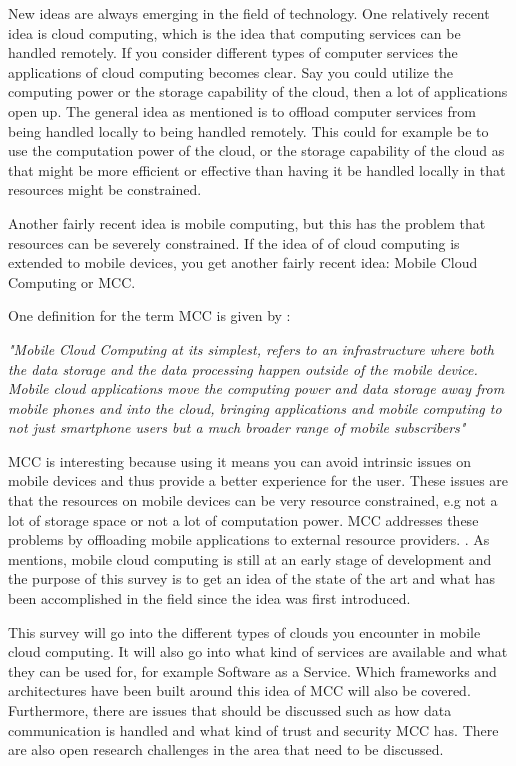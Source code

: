 
New ideas are always emerging in the field of technology.
One relatively recent idea is cloud computing, which is the idea that computing services can be handled remotely.
If you consider different types of computer services the applications of cloud computing becomes clear.
Say you could utilize the computing power or the storage capability of the cloud, then a lot of applications open up.
The general idea as mentioned is to offload computer services from being handled locally to being handled remotely. 
This could for example be to use the computation power of the cloud, or the storage capability of the cloud as that might be more efficient or effective than having it be handled locally in that resources might be constrained.

Another fairly recent idea is mobile computing, but this has the problem that resources can be severely constrained. 
If the idea of of cloud computing is extended to mobile devices, you get another fairly recent idea: Mobile Cloud Computing or MCC.

One definition for the term MCC is given by \citet{article:mobilecloudreviewinderkildesecurity}:

\textit{"Mobile Cloud Computing at its simplest, refers to an infrastructure where both the data storage and the data processing happen outside of the mobile device. Mobile cloud applications move the computing power and data storage away from mobile phones and into the cloud, bringing applications and mobile computing to not just smartphone users but a much broader range of mobile subscribers"}

MCC is interesting because using it means you can avoid intrinsic issues on mobile devices and thus provide a better experience for the user. 
These issues are that the resources on mobile devices can be very resource constrained, e.g not a lot of storage space or not a lot of computation power.
MCC addresses these problems by offloading mobile applications to external resource providers. \citet{fernando2013mobile}.
As \citet{6215350} mentions, mobile cloud computing is still at an early stage of development and the purpose of this survey is to get an idea of the state of the art and what has been accomplished in the field since the idea was first introduced. 

This survey will go into the different types of clouds you encounter in mobile cloud computing.
It will also go into what kind of services are available and what they can be used for, for example Software as a Service.
Which frameworks and architectures have been built around this idea of MCC will also be covered. 
Furthermore, there are issues that should be discussed such as how data communication is handled and what kind of trust and security MCC has. 
There are also open research challenges in the area that need to be discussed. 